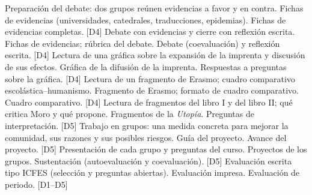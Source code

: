 \documentclass[parcelacion]{planeacion}
\begin{document}
\begin{parcelacion}
    {Preparación del debate: dos grupos reúnen evidencias a favor y en contra.}
    {Fichas de evidencias (universidades, catedrales, traducciones, epidemias).}
    {Fichas de evidencias completas. {\scriptsize[D4]}}
    {Debate con evidencias y cierre con reflexión escrita.}
    {Fichas de evidencias; rúbrica del debate.}
    {Debate (coevaluación) y reflexión escrita. {\scriptsize[D4]}}
    {Lectura de una gráfica sobre la expansión de la imprenta y discusión de sus efectos.}
    {Gráfica de la difusión de la imprenta.}
    {Respuestas a preguntas sobre la gráfica. {\scriptsize[D4]}}
    {Lectura de un fragmento de Erasmo; cuadro comparativo escolástica--humanismo.}
    {Fragmento de Erasmo; formato de cuadro comparativo.}
    {Cuadro comparativo. {\scriptsize[D4]}}
    {Lectura de fragmentos del libro I y del libro II; qué critica Moro y qué propone.}
    {Fragmentos de la \emph{Utopía}.}
    {Preguntas de interpretación. {\scriptsize[D5]}}
    {Trabajo en grupos: una medida concreta para mejorar la comunidad, sus razones y sus
     posibles riesgos.}
    {Guía del proyecto.}
    {Avance del proyecto. {\scriptsize[D5]}}
    {Presentación de cada grupo y preguntas del curso.}
    {Proyectos de los grupos.}
    {Sustentación (autoevaluación y coevaluación). {\scriptsize[D5]}}
    {Evaluación escrita tipo ICFES (selección y preguntas abiertas).}
    {Evaluación impresa.}
    {Evaluación de periodo. {\scriptsize[D1--D5]}}
\end{parcelacion}
\end{document}
